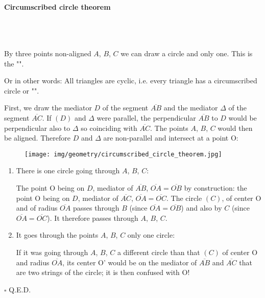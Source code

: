 	\pagebreak
	\paragraph{Circumscribed circle theorem}\mbox{}\\\\
	\begin{theorem}
	By three points non-aligned $A$, $B$, $C$ we can draw a circle and only one. This is the "".
	
	Or in other words: All triangles are cyclic, i.e. every triangle has a circumscribed circle or "".
	\end{theorem}
	\begin{dem}
	 First, we draw the mediator $D$ of  the segment  $\overline{AB} $ and the mediator $\Delta$ of  the segment $\overline{AC}$. If $(D)$ and $\Delta$ were parallel, the perpendicular $\overline{AB}$ to $D$ would be perpendicular also to $\Delta$ so coinciding with $\overline{AC}$. The points $A$, $B$, $C$ would then be aligned. Therefore $D$ and $\Delta$ are non-parallel and intersect at a point O:
	\begin{figure}[H]
		\centering
		\texttt{[image: img/geometry/circumscribed\_circle\_theorem.jpg]}
	\end{figure}
	\begin{enumerate}
		\item There is one circle going through $A$, $B$, $C$:

		The point O being on $D$, mediator of $\overline{AB}$, $\overline{OA} = \overline{OB}$ by construction:  the point O being on $D$, mediator of $\overline{AC}$, $\overline{OA} = \overline{OC}$. The circle $(C)$, of center O and of radius $\overline{OA}$ passes through $B$ (since  $\overline{OA} = \overline{OB}$) and also by $C$ (since $\overline{OA} = \overline{OC}$). It therefore passes through $A$, $B$, $C$.

		\item It goes through the points $A$, $B$, $C$ only one circle: 

		If it was going through $A$, $B$, $C$ a different circle than that $(C)$ of center O and radius $\overline{OA}$, its center O' would be on the mediator of $\overline{AB}$ and $\overline{AC}$ that are two strings of the circle; it is then confused with O!
	\end{enumerate}
	\begin{flushright}
		$\square$  Q.E.D.
	\end{flushright}
	\end{dem}
